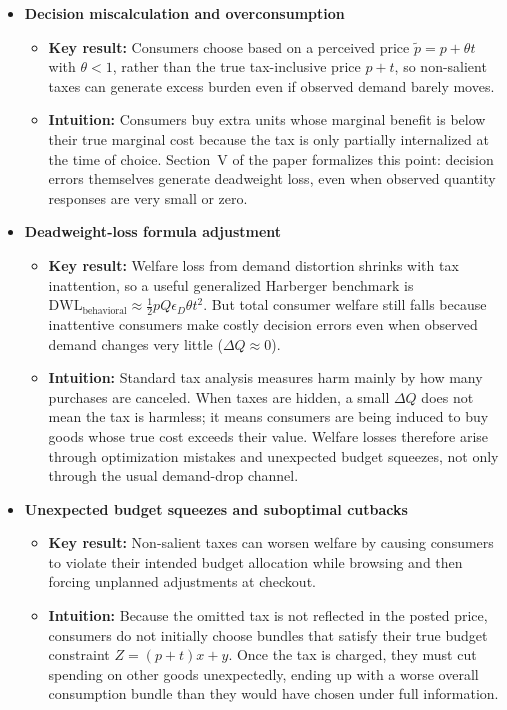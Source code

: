 \documentclass[11pt]{article}
\begin{document}
\begin{itemize}
    \item \textbf{Decision miscalculation and overconsumption}
    \begin{itemize}
        \item \textbf{Key result:} Consumers choose based on a perceived price
        $\tilde{p}=p+\theta t$ with $\theta<1$, rather than the true tax-inclusive
        price $p+t$, so non-salient taxes can generate excess burden even if
        observed demand barely moves.
        \item \textbf{Intuition:} Consumers buy extra units whose marginal
        benefit is below their true marginal cost because the tax is only
        partially internalized at the time of choice.  Section~V of the paper
        formalizes this point: decision errors themselves generate deadweight
        loss, even when observed quantity responses are very small or zero.
    \end{itemize}

    \item \textbf{Deadweight-loss formula adjustment}
    \begin{itemize}
        \item \textbf{Key result:} Welfare loss from demand distortion shrinks
        with tax inattention, so a useful generalized Harberger benchmark is
        $\text{DWL}_{\text{behavioral}} \approx \tfrac12 pQ\epsilon_D \theta t^2$.
        But total consumer welfare still falls because inattentive consumers
        make costly decision errors even when observed demand changes very
        little ($\Delta Q \approx 0$).
        \item \textbf{Intuition:} Standard tax analysis measures harm mainly by
        how many purchases are canceled.  When taxes are hidden, a small
        $\Delta Q$ does not mean the tax is harmless; it means consumers are
        being induced to buy goods whose true cost exceeds their value.
        Welfare losses therefore arise through optimization mistakes and
        unexpected budget squeezes, not only through the usual demand-drop
        channel.
    \end{itemize}

    \item \textbf{Unexpected budget squeezes and suboptimal cutbacks}
    \begin{itemize}
        \item \textbf{Key result:} Non-salient taxes can worsen welfare by
        causing consumers to violate their intended budget allocation while
        browsing and then forcing unplanned adjustments at checkout.
        \item \textbf{Intuition:} Because the omitted tax is not reflected in
        the posted price, consumers do not initially choose bundles that satisfy
        their true budget constraint $Z=(p+t)x+y$.  Once the tax is charged,
        they must cut spending on other goods unexpectedly, ending up with a
        worse overall consumption bundle than they would have chosen under full
        information.
    \end{itemize}
\end{itemize}
\end{document}
